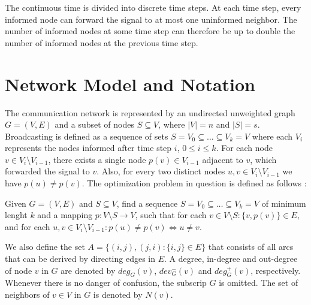 The continuous time is divided into discrete time steps.
At each time step, every informed node can forward the signal to at most one uninformed neighbor.
The number of informed nodes at some time step can therefore be up to double the number of informed nodes at the previous time step.
%
\section{Network Model and Notation}

The communication network is represented by an undirected unweighted graph $G=(V,E)$ and a subset of nodes $S\subseteq V$, where $|V|=n$ and $|S|=s$. 
Broadcasting is defined as a sequence of sets $S=V_0\subseteq\dots\subseteq V_k = V$ where each $V_i$ represents the nodes informed after time step $i$, $0\leq i\leq k$.
For each node $v\in V_i\setminus V_{i-1}$, there exists a single node $p(v)\in V_{i-1}$ adjacent to $v$, which forwarded the signal to $v$.
Also, for every two distinct nodes $u,v\in V_i\setminus V_{i-1}$ we have $p(u)\neq p(v)$.
The optimization problem in question is defined as follows \cite{jansen95,middendorf93}:
\begin{problem}\label{prob:min}
Given $G=(V,E)$ and $S\subseteq V$, find a sequence $S=V_0\subseteq\dots\subseteq V_k=V$ of minimum lenght $k$ 
and a mapping $p:V\setminus S\to V$, such that for each $v\in V\setminus S:\{v,p(v)\}\in E$, and for each $u,v\in V_i\setminus V_{i-1}: p(u)\neq p(v)\Leftrightarrow u\neq v$.
\end{problem}
We also define the set $A=\{(i,j),(j,i):\{i,j\}\in E\}$ that consists of all arcs that can be derived by directing edges in $E$.
A degree, in-degree and out-degree of node $v$ in $G$ are denoted by $deg_G(v)$, $dev^-_G(v)$ and $deg^+_G(v)$, respectively.
Whenever there is no danger of confusion, the subscrip $G$ is omitted.
The set of neighbors of $v\in V$ in $G$ is denoted by $N(v)$.
